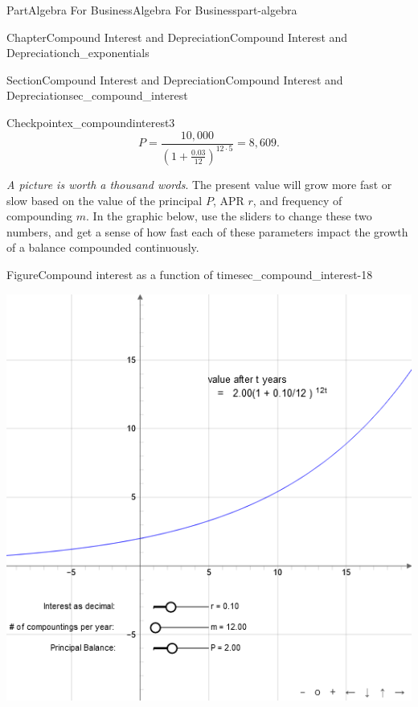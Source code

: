 \documentclass{tufte-book}
\numberwithin{equation}{chapter}
\begin{document}
\begin{partptx}{Part}{Algebra For Business}{}{Algebra For Business}{}{}{part-algebra}
\begin{chapterptx}{Chapter}{Compound Interest and Depreciation}{}{Compound Interest and Depreciation}{}{}{ch_exponentials}
\begin{sectionptx}{Section}{Compound Interest and Depreciation}{}{Compound Interest and Depreciation}{}{}{sec_compound_interest}
\begin{inlineexercise}{Checkpoint}{}{ex_compoundinterest3}
\begin{equation*}
P = \dfrac{10,000}{\left(1 + \frac{0.03}{12}\right)^{12\cdot 5}} = 8,609\text{.}
\end{equation*}
%
\par
%
\end{inlineexercise}%
\emph{A picture is worth a thousand words}. The present value will grow more fast or slow based on the value of the principal \(P\), APR \(r\), and frequency of compounding \(m\).  In the graphic below, use the sliders to change these two numbers, and get a sense of how fast each of these parameters impact the growth of a balance compounded continuously.%
\begin{figureptx}{Figure}{Compound interest as a function of time}{sec_compound_interest-18}{}%
\begin{sidebyside}{2}{0.075}{0.075}{0.17}%
\begin{sbspanel}{0.47}%
\includegraphics[width=\linewidth]{external/jsxgraph-algebra-compound-interest.png}
\end{sbspanel}%
\begin{sbspanel}{0.21}%

\end{sbspanel}
\end{sidebyside}
\end{figureptx}
\end{sectionptx}
\end{chapterptx}
\end{partptx}
\end{document}
